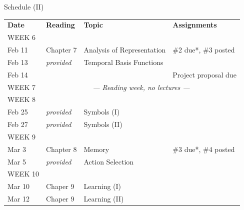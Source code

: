 \documentclass[aspectratio=169]{beamer}
\begin{document}
\begin{frame}{Schedule (II)}
	\small
	\begin{tabular}{p{2cm} p{2cm} p{5cm} p{3cm}}
		\toprule
		\textbf{Date} &	\textbf{Reading} &	\textbf{Topic} & \textbf{Assignments} \\
		\tiny WEEK 6 & & & \\
		Feb 11 &
		Chapter 7 &
		Analysis of Representation &
		\#2 due*, \#3 posted\\
		Feb 13 &
		\emph{provided} &
		Temporal Basis Functions &
		\\
		Feb 14 &
		&
		&
		Project proposal due\\[0.05cm]
		
		\tiny WEEK 7 & \multicolumn{3}{c}{\emph{--- Reading week, no lectures ---}} \\[0.05cm]
		
		\tiny WEEK 8 & & & \\
		Feb 25 &
		\emph{provided} &
		Symbols (I) &
		\\
		Feb 27 &
		\emph{provided} &
		Symbols (II) &
		\\[0.05cm]
		
		\tiny WEEK 9 & & & \\
		Mar 3 &
		Chapter 8 &
		Memory &
		\#3 due*, \#4 posted\\
		Mar 5 &
		\emph{provided} &
		Action Selection &
		\\[0.05cm]
		
		\tiny WEEK 10 & & & \\
		Mar 10 &
		Chaper 9 &
		Learning (I) &
		\\
		Mar 12 &
		Chaper 9 &
		Learning (II) &
		\\
		\bottomrule
	\end{tabular}
\end{frame}
\end{document}
